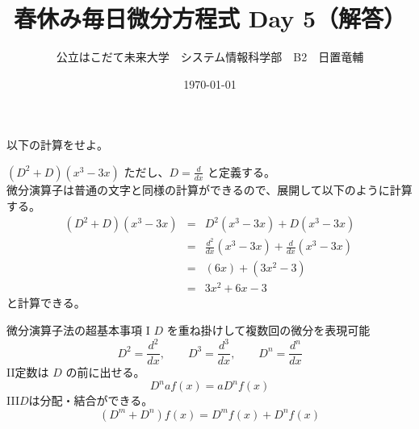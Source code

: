 \documentclass[dvipdfmx,uplatex]{jsarticle}
\title{春休み毎日微分方程式 Day 5（解答）}
\author{公立はこだて未来大学　システム情報科学部　B2　日置竜輔}
\date{\today}
\begin{document}
\begin{spacing}{1.6}
\maketitle

以下の計算をせよ。
\begin{qparts}
    \qpart $ \displaystyle (D ^ 2 + D)(x ^ 3 - 3x) $ \quad ただし、$ \displaystyle D = \frac{d}{dx} $ と定義する。\\
    微分演算子は普通の文字と同様の計算ができるので、展開して以下のように計算する。 \\
    \begin{eqnarray*}
      (D ^ 2 + D)(x ^ 3 - 3x) & = & D ^ 2 (x ^ 3 - 3x) + D (x ^ 3 - 3x)\\
      & = & \frac{d^2}{dx}(x ^ 3 - 3x) + \frac{d}{dx}(x ^ 3 - 3x)\\
      & = & (6x) + (3x ^ 2 - 3)\\
      & = & 3x ^ 2  + 6x - 3
    \end{eqnarray*}
    と計算できる。\\
    \begin{itembox}{微分演算子法の超基本事項}
      {\rm I} \quad $ D $ を重ね掛けして複数回の微分を表現可能 \\
      \begin{equation*}
        D^2 = \frac{d^2}{dx},\qquad D^3 = \frac{d ^ 3}{dx}, \qquad D ^ n = \frac{d^n}{dx}
      \end{equation*}
      {\rm II}\quad 定数は $ D $ の前に出せる。\\
      \begin{equation*}
        D^naf(x) = aD^nf(x)
      \end{equation*}
      {\rm III}\quad $ D $は分配・結合ができる。\\
      \begin{equation*}
        (D ^ m + D ^ n)f(x) = D^mf(x) + D^nf(x)
      \end{equation*}
    \end{itembox}
\end{qparts}
\end{spacing}
\end{document}
